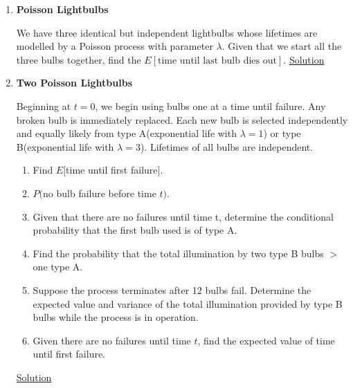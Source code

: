 \documentclass[../probability-notes.tex]{subfiles}
\begin{document}
\begin{enumerate}
    \item \hypertarget{q_poissonbulb}{\textbf{Poisson Lightbulbs}}\newline
    We have three identical but independent lightbulbs whose lifetimes are modelled by a Poisson process with parameter $\lambda$. Given that we start all the three bulbs together, find the $E[\text{time until last bulb dies out}]$. \hyperlink{a_poissonbulb}{Solution}


    \item \hypertarget{q_poissonbulb2}{\textbf{Two Poisson Lightbulbs}}\newline
    Beginning at $t=0$, we begin using bulbs one at a time until failure. Any broken bulb is immediately replaced. Each new bulb is selected independently and equally likely from type A(exponential life with $\lambda = 1$) or type B(exponential life with $\lambda = 3$). Lifetimes of all bulbs are independent.
    \begin{enumerate}
        \item Find $E[$time until first failure$]$.
        \item $P($no bulb failure before time $t)$.
        \item Given that there are no failures until time t, determine the conditional probability that the first bulb used is of type A.
        \item Find the probability that the total illumination by two type B bulbs $>$ one type A.
        \item Suppose the process terminates after 12 bulbs fail. Determine the expected value and variance of the total illumination provided by type B bulbs while the process is in operation.
        \item Given there are no failures until time $t$, find the expected value of time until first failure.
    \end{enumerate}
    \hyperlink{a_poissonbulb2}{Solution}


\end{enumerate}
\end{document}
